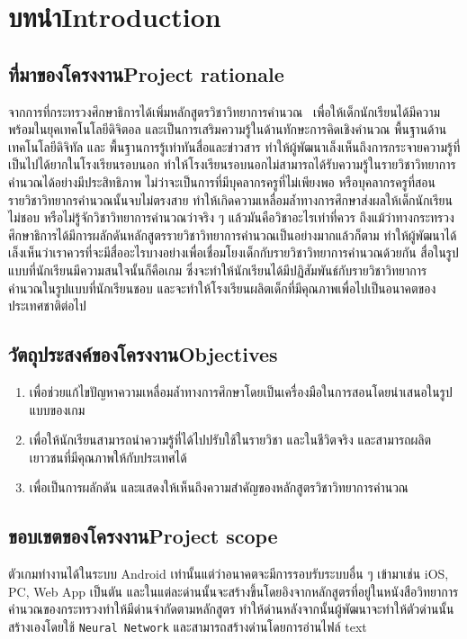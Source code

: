 \chapter{\ifcpe บทนำ\else Introduction\fi}

\section{\ifcpe ที่มาของโครงงาน\else Project rationale\fi}
จากการที่กระทรวงศึกษาธิการได้เพิ่มหลักสูตรวิชาวิทยาการคำนวณ~\cite{cpc} 
เพื่อให้เด็กนักเรียนได้มีความพร้อมในยุคเทคโนโลยีดิจิตอล 
และเป็นการเสริมความรู้ในด้านทักษะการคิดเชิงคำนวณ 
พื้นฐานด้านเทคโนโลยีดิจิทัล และ พื้นฐานการรู้เท่าทันสื่อและข่าวสาร 
ทำให้ผู้พัฒนาเล็งเห็นถึงการกระจายความรู้ที่เป็นไปได้ยากในโรงเรียนรอบนอก 
ทำให้โรงเรียนรอบนอกไม่สามารถได้รับความรู้ในรายวิชาวิทยาการคำนวณได้อย่างมีประสิทธิภาพ 
ไม่ว่าจะเป็นการที่มีบุคลากรครูที่ไม่เพียงพอ หรือบุคลากรครูที่สอนรายวิชาวิทยากรคำนวณนั้นจบไม่ตรงสาย 
ทำให้เกิดความเหลื่อมล้ำทางการศึกษาส่งผลให้เด็กนักเรียนไม่ชอบ หรือไม่รู้จักวิชาวิทยาการคำนวณว่าจริง ๆ 
แล้วมันคือวิชาอะไรเท่าที่ควร ถึงแม้ว่าทางกระทรวงศึกษาธิการได้มีการผลักดันหลักสูตรรายวิชาวิทยาการคำนวณเป็นอย่างมากแล้วก็ตาม
ทำให้ผู้พัฒนาได้เล็งเห็นว่าเราควรที่จะมีสื่ออะไรบางอย่างเพื่อเชื่อมโยงเด็กกับรายวิชาวิทยาการคำนวณด้วยกัน 
สื่อในรูปแบบที่นักเรียนมีความสนใจนั้นก็คือเกม ซึ่งจะทำให้นักเรียนได้มีปฏิสัมพันธ์กับรายวิชาวิทยาการคำนวณในรูปแบบที่นักเรียนชอบ 
และจะทำให้โรงเรียนผลิตเด็กที่มีคุณภาพเพื่อไปเป็นอนาคตของประเทศชาติต่อไป

\section{\ifcpe วัตถุประสงค์ของโครงงาน\else Objectives\fi}
\begin{enumerate}
    \item เพื่อช่วยแก้ไขปัญหาความเหลื่อมล้ำทางการศึกษาโดยเป็นเครื่องมือในการสอนโดยนำเสนอในรูปแบบของเกม
    \item เพื่อให้นักเรียนสามารถนำความรู้ที่ได้ไปปรับใช้ในรายวิชา และในชีวิตจริง และสามารถผลิตเยาวชนที่มีคุณภาพให้กับประเทศได้
    \item เพื่อเป็นการผลักดัน และแสดงให้เห็นถึงความสำคัญของหลักสูตรวิชาวิทยาการคำนวณ
\end{enumerate}

\section{\ifcpe ขอบเขตของโครงงาน\else Project scope\fi}
ตัวเกมทำงานได้ในระบบ Android เท่านั้นแต่ว่าอนาคตจะมีการรอบรับระบบอื่น ๆ 
เข้ามาเช่น iOS, PC, Web App เป็นตัน 
และในแต่ละด่านนั้นจะสร้างขึ้นโดยอิงจากหลักสูตรที่อยู่ในหนังสือวิทยาการคำนวณของกระทรวงทำให้มีด่านจำกัดตามหลักสูตร 
ทำให้ด่านหลังจากนั้นผู้พัฒนาจะทำให้ตัวด่านนั้นสร้างเองโดยใช้ \texttt{Neural Network} และสามารถสร้างด่านโดยการอ่านไฟล์ text

